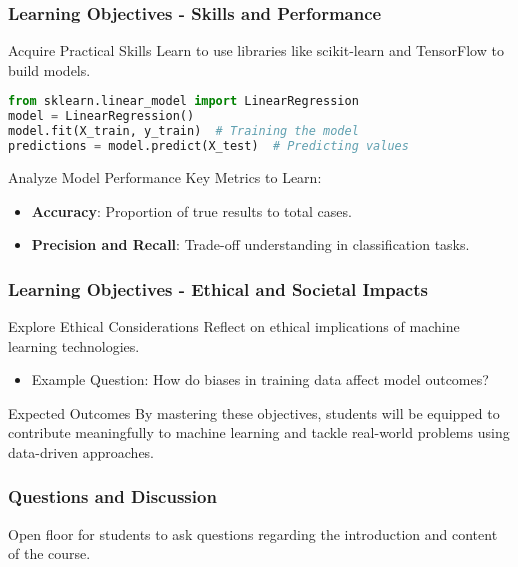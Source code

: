 \documentclass[aspectratio=169]{beamer}
\begin{document}
\begin{frame}[fragile]
    \frametitle{Learning Objectives - Skills and Performance}
    \begin{block}{Acquire Practical Skills}
        Learn to use libraries like scikit-learn and TensorFlow to build models.
        \begin{lstlisting}[language=Python]
from sklearn.linear_model import LinearRegression
model = LinearRegression()
model.fit(X_train, y_train)  # Training the model
predictions = model.predict(X_test)  # Predicting values
        \end{lstlisting}
    \end{block}
    \begin{block}{Analyze Model Performance}
        Key Metrics to Learn:
        \begin{itemize}
            \item \textbf{Accuracy}: Proportion of true results to total cases.
            \item \textbf{Precision and Recall}: Trade-off understanding in classification tasks.
        \end{itemize}
    \end{block}
\end{frame}

\begin{frame}[fragile]
    \frametitle{Learning Objectives - Ethical and Societal Impacts}
    \begin{block}{Explore Ethical Considerations}
        Reflect on ethical implications of machine learning technologies.
        \begin{itemize}
            \item Example Question: How do biases in training data affect model outcomes?
        \end{itemize}
    \end{block}
    \begin{block}{Expected Outcomes}
        By mastering these objectives, students will be equipped to contribute meaningfully to machine learning and tackle real-world problems using data-driven approaches.
    \end{block}
\end{frame}

\begin{frame}[fragile]
    \frametitle{Questions and Discussion}
    Open floor for students to ask questions regarding the introduction and content of the course.
\end{frame}
\end{document}
